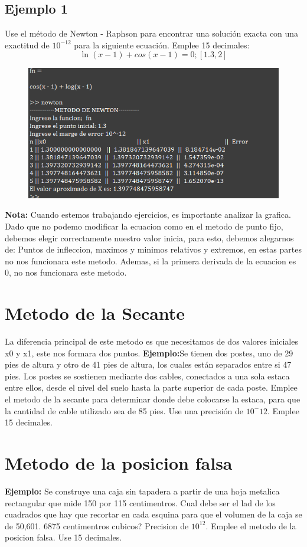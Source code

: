 \documentclass{article}
\theoremstyle{mytheoremstyle}
\theoremstyle{mytheoremstyle}
\theoremstyle{myproblemstyle}
\begin{document}
    \subsection*{Ejemplo 1}
    Use el método de Newton - Raphson para encontrar una solución exacta con una exactitud de $10^{-12}$ para la siguiente ecuación. Emplee 15 decimales: 
    \[
        \ln(x-1)+cos(x-1)=0 ; [1.3,2]
    \]
    \begin{figure}[ht]
        \includegraphics*[scale=0.9]{img/ejemplo3.png}
    \end{figure}
    
    \textbf{Nota:} Cuando estemos trabajando ejercicios, es importante analizar la grafica. Dado que no podemo modificar la ecuacion como en el metodo de punto fijo, debemos elegir correctamente nuestro valor inicia,
    para esto, debemos alegarnos de: Puntos de infleccion, maximos y minimos relativos y extremos, en estas partes no nos funcionara este metodo.
    Ademas, si la primera derivada de la ecuacion es 0, no nos funcionara este metodo.
\pagebreak
\section*{Metodo de la Secante}
La diferencia principal de este metodo es que necesitamos de dos valores iniciales x0 y x1, este nos formara dos puntos.
\textbf{Ejemplo:}Se tienen dos postes, uno de 29 pies de altura y otro de 41 pies de altura, los  cuales están separados entre si 47 pies. Los postes se sostienen mediante dos cables, conectados a una sola
estaca entre ellos, desde el nivel del suelo hasta la parte superior de cada poste. Emplee el metodo de la secante para determinar donde debe colocarse la estaca, para que la cantidad de cable utilizado sea de 85 pies.
Use una precisión de $10^-12$. Emplee 15 decimales.
\pagebreak
\section*{Metodo de la posicion falsa}
\textbf{Ejemplo:} Se construye una caja sin tapadera a partir de una hoja metalica rectangular que mide 150 por 115 centimentros. Cual debe ser el lad de los cuadrados que hay que recortar en cada esquina para que
el volumen de la caja se de 50,601. 6875 centimentros cubicos? Precision de $10^{12}$. Emplee el metodo de la posicion falsa. Use 15 decimales.
\end{document}
